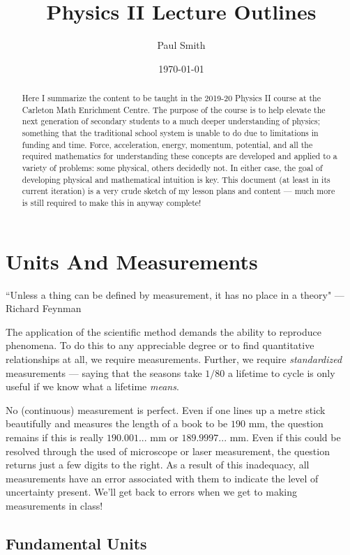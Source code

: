 \documentclass[letterpaper,12pt]{article}
\begin{document}
\title{Physics II Lecture Outlines}
\author{Paul Smith}
\date{\today}
\maketitle

\begin{abstract}
Here I summarize the content to be taught in the 2019-20 Physics II course at the Carleton Math Enrichment Centre. The purpose of the course is to help elevate the next generation of secondary students to a much deeper understanding of physics; something that the traditional school system is unable to do due to limitations in funding and time. Force, acceleration, energy, momentum, potential, and all the required mathematics for understanding these concepts are developed and applied to a variety of problems: some physical, others decidedly not. In either case, the goal of developing physical and mathematical intuition is key. This document (at least in its current iteration) is a very crude sketch of my lesson plans and content --- much more is still required to make this in anyway complete! 
\end{abstract}

\section{Units And Measurements}\label{Units}
``Unless a thing can be defined by measurement, it has no place in a theory" --- Richard Feynman

The application of the scientific method demands the ability to reproduce phenomena. To do this to any appreciable degree or to find quantitative relationships at all, we require measurements. Further, we require \textit{standardized} measurements --- saying that the seasons take $1/80$ a lifetime to cycle is only useful if we know what a lifetime \textit{means}. 

No (continuous) measurement is perfect. Even if one lines up a metre stick beautifully and measures the length of a book to be $190$ mm, the question remains if this is really $190.001...$ mm or $189.9997...$ mm. Even if this could be resolved through the used of microscope or laser measurement, the question returns just a few digits to the right. As a result of this inadequacy, all measurements have an error associated with them to indicate the level of uncertainty present. We'll get back to errors when we get to making measurements in class! 

\subsection{Fundamental Units}\label{sec:units}
\end{document}

